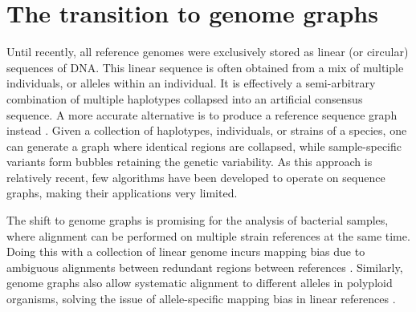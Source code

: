 \section{The transition to genome graphs}

Until recently, all reference genomes were exclusively stored as linear (or circular) sequences of DNA. This linear sequence is often obtained from a mix of multiple individuals, or alleles within an individual. It is effectively a semi-arbitrary combination of multiple haplotypes collapsed into an artificial consensus sequence. A more accurate alternative is to produce a reference sequence graph instead \cite{churchExtendingReferenceAssembly2015}. Given a collection of haplotypes, individuals, or strains of a species, one can generate a graph where identical regions are collapsed, while sample-specific variants form bubbles retaining the genetic variability. As this approach is relatively recent, few algorithms have been developed to operate on sequence graphs, making their applications very limited.

The shift to genome graphs is promising for the analysis of bacterial samples, where alignment can be performed on multiple strain references at the same time. Doing this with a collection of linear genome incurs mapping bias due to ambiguous alignments between redundant regions between references \cite{liDesignConstructionReference2020}. Similarly, genome graphs also allow systematic alignment to different alleles in polyploid organisms, solving the issue of allele-specific mapping bias in linear references \cite{vandegeijnWASPAllelespecificSoftware2015}. 